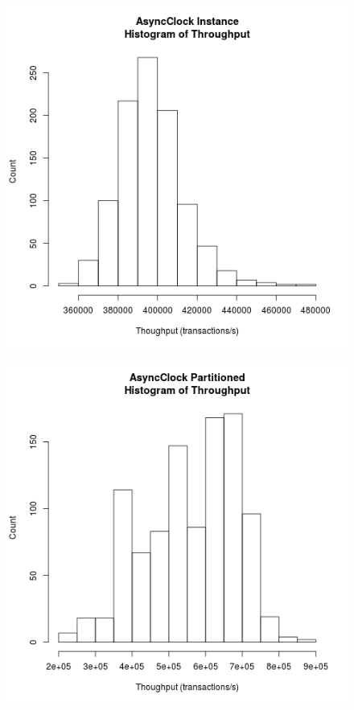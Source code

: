 \begin{figure}
\center
\includegraphics[height=.4\textheight]{async_instance_throughput_hist.png}
\caption{\label{async_instance_throughput}}
\end{figure}

\begin{figure}
\center
\includegraphics[height=.4\textheight]{async_partitioned_throughput_hist.png}
\caption{\label{async_partitioned_throughput}}
\end{figure}

